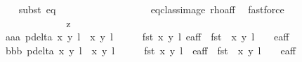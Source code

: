 \begin{isabellebody}
\ \ \ \ \ \ \ \ \ \ \ \ \ \ \isamarkupfalse%
{\isacharparenleft}subst\ eq{\isacharparenright}\ \ \ \isanewline
\ \ \ \ \ \ \ \ \ \ \ \ \ \ \isamarkupfalse%
\ eq{\isacharunderscore}class{\isacharunderscore}image\ rho{\isacharunderscore}aff\ \isamarkupfalse%
\ fastforce\isanewline
\ \ \ \ \ \ \ \ \ \ \isamarkupfalse%
\isanewline
\ \ \ \ \ \ \ \ \ \ \ \ \isamarkupfalse%
\ z{}\ \ \ \ \isanewline
\ \ \ \ \ \ \ \ \ \ \ \ \isamarkupfalse%
\isanewline
\ \ \ \ \ \ \ \ \ \ \ \ {\isacharparenleft}aaa{\isacharparenright}\ {\isachardoublequoteopen}p{\isacharunderscore}delta\ {\isacharparenleft}{\isacharparenleft}x{\isacharcomma}\ y{\isacharparenright}{\isacharcomma}\ l{\isacharparenright}\ {\isacharparenleft}{\isasymtau}\ {\isacharparenleft}x{\isacharprime}{\isacharcomma}\ y{\isacharprime}{\isacharparenright}{\isacharcomma}\ l{\isacharprime}\ {\isacharplus}\ {}{\isacharparenright}\ {\isasymnoteq}\ {}\ {\isasymand}\ fst\ {\isacharparenleft}{\isacharparenleft}x{\isacharcomma}\ y{\isacharparenright}{\isacharcomma}\ l{\isacharparenright}{\isasymin}\ e{\isacharunderscore}aff\ {\isasymand}\ fst\ {\isacharparenleft}{\isasymtau}\ {\isacharparenleft}x{\isacharprime}{\isacharcomma}\ y{\isacharprime}{\isacharparenright}{\isacharcomma}\ l{\isacharprime}\ {\isacharplus}\ {}{\isacharparenright}\ {\isasymin}\ e{\isacharunderscore}aff{\isachardoublequoteclose}\ {\isacharbar}\isanewline
\ \ \ \ \ \ \ \ \ \ \ \ {\isacharparenleft}bbb{\isacharparenright}\ {\isachardoublequoteopen}p{\isacharunderscore}delta{\isacharprime}\ {\isacharparenleft}{\isacharparenleft}x{\isacharcomma}\ y{\isacharparenright}{\isacharcomma}\ l{\isacharparenright}\ {\isacharparenleft}{\isasymtau}\ {\isacharparenleft}x{\isacharprime}{\isacharcomma}\ y{\isacharprime}{\isacharparenright}{\isacharcomma}\ l{\isacharprime}\ {\isacharplus}\ {}{\isacharparenright}\ {\isasymnoteq}\ {}\ {\isasymand}\ fst\ {\isacharparenleft}{\isacharparenleft}x{\isacharcomma}\ y{\isacharparenright}{\isacharcomma}\ l{\isacharparenright}\ {\isasymin}\ e{\isacharunderscore}aff\ {\isasymand}\ fst\ {\isacharparenleft}{\isasymtau}\ {\isacharparenleft}x{\isacharprime}{\isacharcomma}\ y{\isacharprime}{\isacharparenright}{\isacharcomma}\ l{\isacharprime}\ {\isacharplus}\ {}{\isacharparenright}\ {\isasymin}\ e{\isacharunderscore}aff{\isachardoublequoteclose}\ {\isacharbar}\isanewline

\end{isabellebody}
